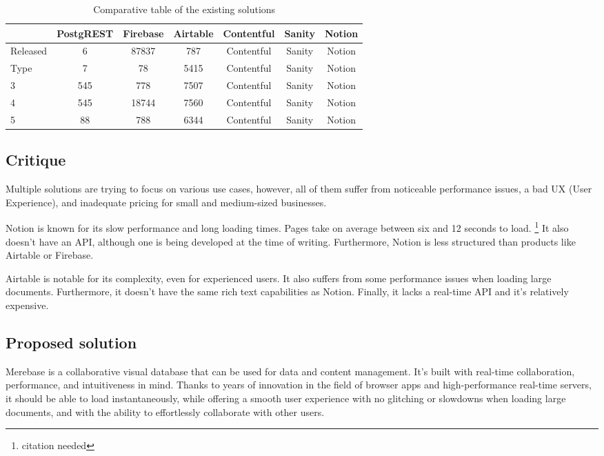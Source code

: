 \begin{table}[h]
	\centerfloat
	\begin{tabular}{ | l | c | c | c | c | c | c | }
		\hline
		         & PostgREST & Firebase & Airtable & Contentful & Sanity & Notion \\
		\hline
		Released & 6         & 87837    & 787      & Contentful & Sanity & Notion \\
		Type     & 7         & 78       & 5415     & Contentful & Sanity & Notion \\
		3        & 545       & 778      & 7507     & Contentful & Sanity & Notion \\
		4        & 545       & 18744    & 7560     & Contentful & Sanity & Notion \\
		5        & 88        & 788      & 6344     & Contentful & Sanity & Notion \\
		\hline
	\end{tabular}
	\caption{Comparative table of the existing solutions}
	\label{table:exisiting-solutions-comparison}
\end{table}

\subsection{Critique}

Multiple solutions are trying to focus on various use cases, however,
all of them suffer from noticeable performance issues, a bad UX (User
Experience), and inadequate pricing for small and medium-sized
businesses.

Notion is known for its slow performance and long loading times. Pages
take on average between six and 12 seconds to load. \footnote{citation
	needed} It also doesn't have an API, although one is being developed
at the time of writing. Furthermore, Notion is less structured than
products like Airtable or Firebase.

Airtable is notable for its complexity, even for experienced users. It
also suffers from some performance issues when loading large documents.
Furthermore, it doesn't have the same rich text capabilities as Notion.
Finally, it lacks a real-time API and it's relatively expensive.

\subsection{Proposed solution}

Merebase is a collaborative visual database that can be used for data
and content management. It's built with real-time collaboration,
performance, and intuitiveness in mind. Thanks to years of innovation in
the field of browser apps and high-performance real-time servers, it
should be able to load instantaneously, while offering a smooth user
experience with no glitching or slowdowns when loading large documents,
and with the ability to effortlessly collaborate with other users.

